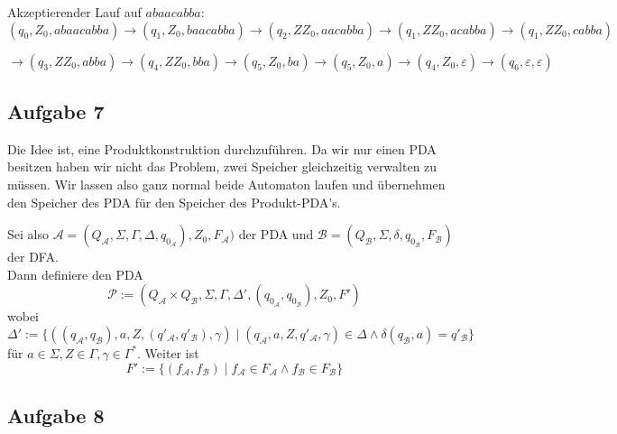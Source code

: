 \documentclass[a4paper,graphics,11pt]{article}
\newcommand{\aufgabe}[1]{\subsection*{Aufgabe #1}}
\begin{document}
Akzeptierender Lauf auf $abaacabba$:\\
$(q_0,Z_0,abaacabba)\rightarrow(q_1,Z_0,baacabba)\rightarrow(q_2,ZZ_0,aacabba)\rightarrow(q_1,ZZ_0,acabba)\rightarrow(q_1,ZZ_0,cabba)$

$\rightarrow(q_3,ZZ_0,abba)\rightarrow(q_4,ZZ_0,bba)\rightarrow(q_5,Z_0,ba)\rightarrow(q_5,Z_0,a)\rightarrow(q_4,Z_0,\varepsilon)\rightarrow(q_6,\varepsilon,\varepsilon)$



\newpage

\aufgabe{7}
Die Idee ist, eine Produktkonstruktion durchzuführen. Da wir nur einen PDA besitzen haben wir nicht das Problem,
zwei Speicher gleichzeitig verwalten zu müssen. Wir lassen also ganz normal beide Automaton laufen
und übernehmen den Speicher des PDA für den Speicher des Produkt-PDA's.

Sei also $\mathcal{A} = (Q_\mathcal{A}, \Sigma, \Gamma, \Delta, q_{0_\mathcal{A}}), Z_0, F_\mathcal{A})$
der PDA
und $\mathcal{B} = (Q_\mathcal{B}, \Sigma, \delta, q_{0_\mathcal{B}}, F_\mathcal{B})$ der DFA.\\
Dann definiere den PDA
$$
    \mathcal{P} := (Q_\mathcal{A} \times Q_\mathcal{B}, \Sigma, \Gamma, \Delta', (q_{0_\mathcal{A}}, q_{0_\mathcal{B}}), Z_0, F')
$$
wobei
$$
    \Delta' := \{((q_\mathcal{A}, q_\mathcal{B}), a, Z, (q'_\mathcal{A}, q'_\mathcal{B}), \gamma)
    \mid (q_\mathcal{A}, a, Z, q'_\mathcal{A}, \gamma) \in \Delta \land \delta(q_\mathcal{B}, a) = q'_\mathcal{B}\}
$$
für $a \in \Sigma, Z \in \Gamma, \gamma \in \Gamma^*$.
Weiter ist
$$
    F' := \{(f_\mathcal{A},f_\mathcal{B}) \mid f_\mathcal{A} \in F_\mathcal{A} \land f_\mathcal{B} \in F_\mathcal{B}\}
$$

\aufgabe{8}
\end{document}
